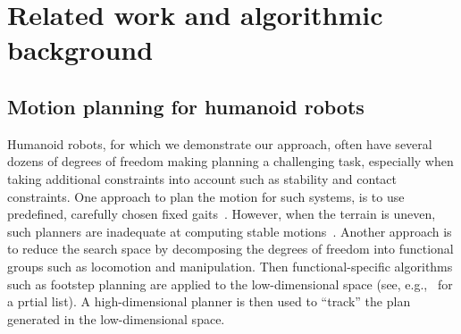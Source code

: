 \documentclass[conference]{IEEEtran}
\begin{document}
%
%
%
%
%
%
%
%
%
%
%
\section{Related work and algorithmic background}
\subsection{Motion planning for humanoid robots}
\label{sec:rel}
Humanoid robots, for which we demonstrate our approach, often have several dozens of degrees of freedom making planning a challenging task, especially when taking additional constraints into account such as stability and contact constraints.
One approach to plan the motion for such systems, is to use predefined, carefully chosen fixed gaits~\cite{KKKHKHAI04}. 
However, when the terrain is uneven, such planners are inadequate at computing stable motions~\cite{HBLHW08}.
Another approach is to reduce the search space by decomposing the degrees of freedom into functional groups such as locomotion and manipulation.
Then functional-specific algorithms such as footstep planning are applied to the low-dimensional space (see, e.g.,~\cite{CLCKHK05, KNKII01, PSBLY12, XCXZC09, KKNII02} for a prtial list).
A high-dimensional planner is then used to ``track'' the plan generated in the low-dimensional space.
\end{document}
